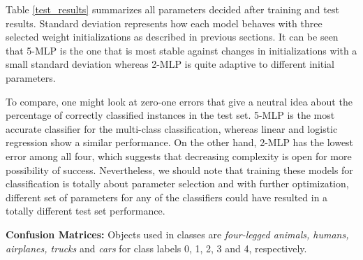 \documentclass[10pt]{article}
\begin{document}
Table \ref{test_results} summarizes all parameters decided after training and test results. Standard deviation represents how each model behaves with three selected weight initializations as described in previous sections. It can be seen that 5-MLP is the one that is most stable against changes in initializations with a small standard deviation whereas 2-MLP is quite adaptive to different initial parameters. 

To compare, one might look at zero-one errors that give a neutral idea about the percentage of correctly classified instances in the test set. 5-MLP is the most accurate classifier for the multi-class classification, whereas linear and logistic regression show a similar performance. On the other hand, 2-MLP has the lowest error among all four, which suggests that decreasing complexity is open for more possibility of success. Nevertheless, we should note that training these models for classification is totally about parameter selection and with further optimization, different set of parameters for any of the classifiers could have resulted in a totally different test set performance.

\textbf{Confusion Matrices:} Objects used in classes are \textit{four-legged animals, humans, airplanes, trucks} and \textit{cars} for class labels 0, 1, 2, 3 and 4, respectively. \\
\end{document}
